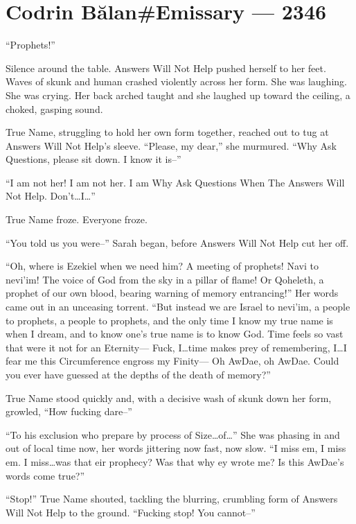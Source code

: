 \hypertarget{codrin-bux103lanemissary-2346}{%
\chapter{Codrin Bălan\#Emissary — 2346}\label{codrin-bux103lanemissary-2346}}

``Prophets!''

Silence around the table. Answers Will Not Help pushed herself to her feet. Waves of skunk and human crashed violently across her form. She was laughing. She was crying. Her back arched taught and she laughed up toward the ceiling, a choked, gasping sound.

True Name, struggling to hold her own form together, reached out to tug at Answers Will Not Help's sleeve. ``Please, my dear,'' she murmured. ``Why Ask Questions, please sit down. I know it is--''

``I am not her! I am not her. I am Why Ask Questions When The Answers Will Not Help. Don't\ldots I\ldots{}''

True Name froze. Everyone froze.

``You told us you were--'' Sarah began, before Answers Will Not Help cut her off.

``Oh, where is Ezekiel when we need him? A meeting of prophets! Navi to nevi'im! The voice of God from the sky in a pillar of flame! Or Qoheleth, a prophet of our own blood, bearing warning of memory entrancing!'' Her words came out in an unceasing torrent. ``But instead we are Israel to nevi'im, a people to prophets, a people to prophets, and the only time I know my true name is when I dream, and to know one's true name is to know God. Time feels so vast that were it not for an Eternity— Fuck, I\ldots time makes prey of remembering, I\ldots I fear me this Circumference engross my Finity— Oh AwDae, oh AwDae. Could you ever have guessed at the depths of the death of memory?''

True Name stood quickly and, with a decisive wash of skunk down her form, growled, ``How fucking dare--''

``To his exclusion who prepare by process of Size\ldots of\ldots{}'' She was phasing in and out of local time now, her words jittering now fast, now slow. ``I miss em, I miss em. I miss\ldots was that eir prophecy? Was that why ey wrote me? Is this AwDae's words come true?''

``Stop!'' True Name shouted, tackling the blurring, crumbling form of Answers Will Not Help to the ground. ``Fucking stop! You cannot--''

